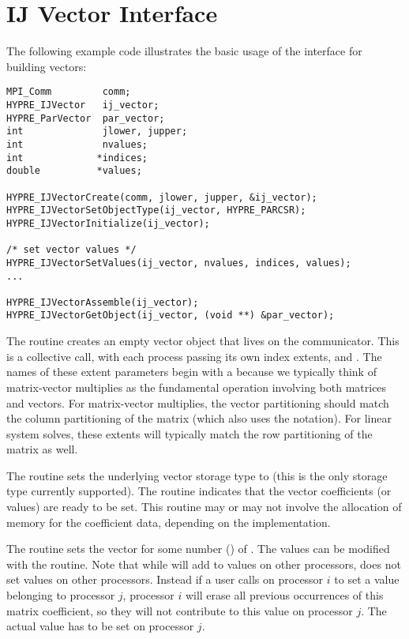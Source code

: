 
\section{IJ Vector Interface}

The following example code illustrates the basic usage of the
 interface for building vectors:

\begin{display}
\begin{verbatim}
MPI_Comm         comm;
HYPRE_IJVector   ij_vector;
HYPRE_ParVector  par_vector;
int              jlower, jupper;
int              nvalues;
int             *indices;
double          *values;

HYPRE_IJVectorCreate(comm, jlower, jupper, &ij_vector);
HYPRE_IJVectorSetObjectType(ij_vector, HYPRE_PARCSR);
HYPRE_IJVectorInitialize(ij_vector);

/* set vector values */
HYPRE_IJVectorSetValues(ij_vector, nvalues, indices, values);
...

HYPRE_IJVectorAssemble(ij_vector);
HYPRE_IJVectorGetObject(ij_vector, (void **) &par_vector);

\end{verbatim}
\end{display}
The  routine creates an empty vector object that lives
on the  communicator.  This is a collective call, with each
process passing its own index extents,  and
.  The names of these extent parameters begin with a
 because we typically think of matrix-vector multiplies as
the fundamental operation involving both matrices and vectors.  For
matrix-vector multiplies, the vector partitioning should match the
column partitioning of the matrix (which also uses the 
notation).  For linear system solves, these extents will typically
match the row partitioning of the matrix as well.

The  routine sets the underlying vector storage
type to  (this is the only storage type currently
supported).  The  routine indicates that the vector
coefficients (or values) are ready to be set.  This routine may or may
not involve the allocation of memory for the coefficient data,
depending on the implementation.

The  routine sets the vector  for some
number () of .  
The values can be modified with the
 routine. 
Note that while 
will add to values on other processors,  does not set
values on other processors. Instead if a user calls 
on processor $i$ to set a value belonging to processor $j$, 
processor $i$ will
erase all previous occurrences of this matrix coefficient,
so they will not contribute to this value on processor $j$.
The actual value has to be set on processor $j$.

